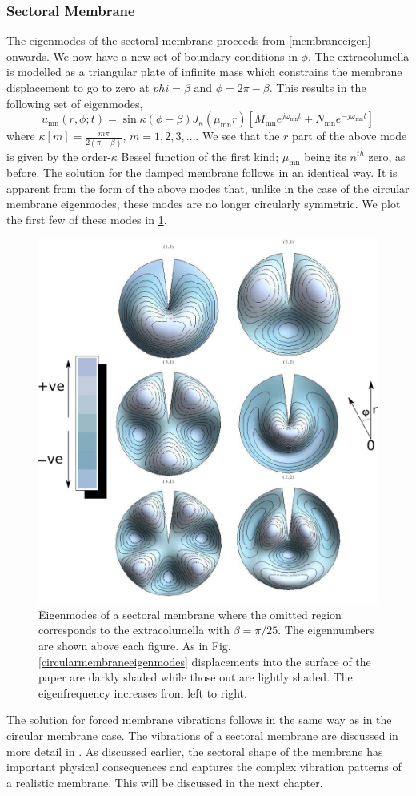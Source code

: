 \subsubsection{Sectoral Membrane}
The eigenmodes of the sectoral membrane proceeds from \eqref{membraneeigen} onwards. We now have a new set of boundary conditions in $\phi$.
The extracolumella is modelled as a triangular plate of infinite mass which constrains the membrane displacement to go to zero at $phi=\beta$
and $\phi=2\pi-\beta$. This results in the following set of eigenmodes,
\begin{equation}\label{sectoraleigenmode}
 u_{\mathrm{mn}}(r,\phi;t)=\sin \kappa(\phi-\beta) J_\kappa(\mu_{\mathrm{mn}} r)\left[M_{\mathrm{mn}}e^{j\omega_{\mathrm{mn}} t}+N_{\mathrm{mn}}e^{-j\omega_{\mathrm{mn}} t}\right]
\end{equation}
where $\kappa[m]=\frac{m\pi}{2(\pi-\beta)}$, $m=1,2,3,\ldots$. We see that the $r$ part of the above mode is given by the
order-$\kappa$ Bessel function of the first kind; $\mu_{\mathrm{mn}}$ being its $n^{th}$ zero, as before. The solution for the damped
membrane follows in an identical way.
It is apparent from the form of the above modes that, unlike in the case of the circular membrane eigenmodes, these modes
are no longer circularly symmetric. We plot the first few of these modes in \ref{sectoralmembraneeigenmodes}. 
\begin{figure}[ht!]
 \centering
 \includegraphics[width=.7\linewidth]{Diagrams/SectorMembraneModes/membrane_modes_all2.png}
 \caption[Sectoral membrane eigenmodes]{Eigenmodes of a sectoral membrane where the omitted region corresponds to the extracolumella with $\beta=\pi/25$. The eigennumbers are
 shown above each figure.
 As in Fig. \ref{circularmembraneeigenmodes} displacements into the surface of the paper are darkly shaded while those out are lightly shaded. The eigenfrequency increases from left to right.}
  \label{sectoralmembraneeigenmodes}
\end{figure}
The solution for forced membrane vibrations follows in the same way as in the circular membrane case. The vibrations of a sectoral membrane
are discussed in more detail in \cite[p.~87]{fletcheracoustic}. As discussed earlier, the sectoral shape of the membrane has important
physical consequences and captures the complex vibration patterns of a realistic membrane. This will be discussed in the next chapter.

